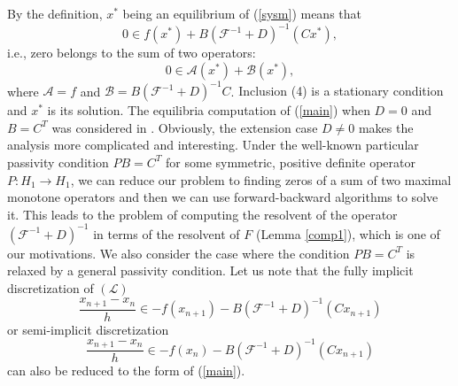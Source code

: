 \documentclass[11pt]{article}
\def\beq{\begin{equation}}
\def\eeq{\end{equation}}
\theoremstyle{plain}
\begin{document}
{{By the definition, $x^*$ being an equilibrium}} of (\ref{sysm}) {{means}} that 
\beq\label{main}
0 \in f(x^*)+B(\mathcal{F}^{-1}+D)^{-1}(Cx^*),
\eeq
{{i.e.,}} zero belongs to {{the}} sum of two operators: 
\beq
0\in \mathcal{A}(x^*)+\mathcal{B}(x^*),
 \eeq
 where $\mathcal{A}=f$ and $\mathcal{B}=B(\mathcal{F}^{-1}+D)^{-1}C$. {{Inclusion (4) is a stationary condition and $x^*$ is its solution.}} The equilibria computation of (\ref{main}) when $D=0$ and $B=C^T$ was considered in \cite{al2}. Obviously, the extension case $D\neq 0$ makes the analysis more complicated and interesting. 
 Under the well-known  particular passivity condition  $PB=C^T$ for some  symmetric, positive definite operator $P: H_1 \to H_1$, we can reduce our problem to {{finding}} zeros of {{a sum}} of two maximal monotone operators and then we can use  forward-backward algorithms \cite{Attouch0,Attouch,Bauschke,Chen,Tseng} to solve it. This leads  to the problem of computing the  resolvent of the operator $(\mathcal{F}^{-1}+D)^{-1}$ in terms of the resolvent of $F$ (Lemma \ref{comp1}), which is one of our motivations. We also consider the case where the  condition $PB=C^T$ is relaxed   by {{a}} general passivity condition. Let us note that  the fully implicit discretization of $({\mathcal L})$
\beq\label{discf}
\frac{x_{n+1}-x_n}{h} \in -f(x_{n+1})-B(\mathcal{F}^{-1}+D)^{-1}(Cx_{n+1})
\eeq
or semi-implicit discretization
\beq\label{discs}
\frac{x_{n+1}-x_n}{h} \in -f(x_{n})-B(\mathcal{F}^{-1}+D)^{-1}(Cx_{n+1})
\eeq
can {{also be}} reduced to the form of (\ref{main}). 
 
\end{document}
